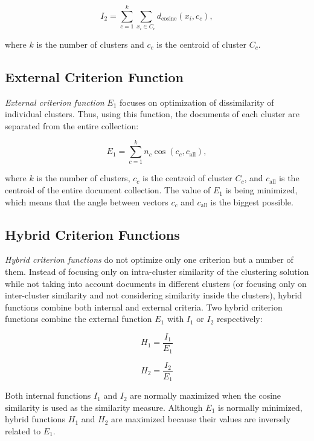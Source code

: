 \documentclass[11pt,openany,executivepaper]{book}
\begin{document}
\begin{equation}
I_2 = \sum_{c=1}^{k} \sum_{x_i \in C_c} d_{\text{cosine}}(x_i, c_c),
\end{equation}

where \( k \) is the number of clusters and \( c_c \) is the centroid of cluster \( C_c \).

\subsection{External Criterion Function}

\textit{External criterion function} \( E_1 \) focuses on optimization of dissimilarity of 
individual clusters. Thus, using this function, the documents of each cluster are 
separated from the entire collection:

\begin{equation}
E_1 = \sum_{c=1}^{k} n_c \cos (c_c, c_{\text{all}}),
\end{equation}

where \( k \) is the number of clusters, \( c_c \) is the centroid of cluster \( C_c \), 
and \( c_{\text{all}} \) is the centroid of the entire document collection. 
The value of \( E_1 \) is being minimized, which means that the angle between vectors 
\( c_c \) and \( c_{\text{all}} \) is the biggest possible.

\subsection{Hybrid Criterion Functions}

\textit{Hybrid criterion functions} do not optimize only one criterion but a number of them.
Instead of focusing only on intra-cluster similarity of the clustering solution while not 
taking into account documents in different clusters (or focusing only on inter-cluster 
similarity and not considering similarity inside the clusters), hybrid functions combine 
both internal and external criteria. Two hybrid criterion functions combine the external 
function \( E_1 \) with \( I_1 \) or \( I_2 \) respectively:

\begin{equation}
H_1 = \frac{I_1}{E_1}
\end{equation}

\begin{equation}
H_2 = \frac{I_2}{E_1}
\end{equation}

Both internal functions \( I_1 \) and \( I_2 \) are normally maximized when the cosine 
similarity is used as the similarity measure. Although \( E_1 \) is normally minimized, 
hybrid functions \( H_1 \) and \( H_2 \) are maximized because their values are inversely 
related to \( E_1 \).
\end{document}
